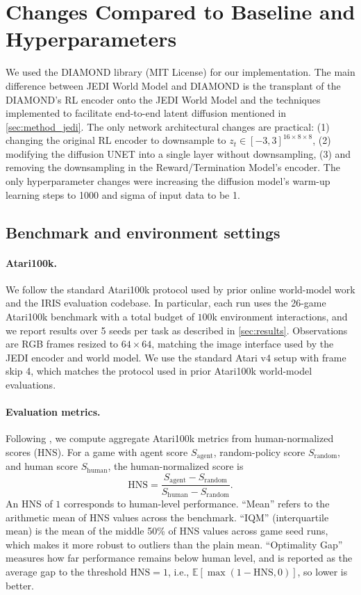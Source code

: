 \documentclass{article}
\begin{document}
\section{Changes Compared to Baseline and Hyperparameters}
\label{appendix:hyperparameters}
We used the DIAMOND library \citep{alonso2024diamond} (MIT License) for our implementation. The main difference between JEDI World Model and DIAMOND is the transplant of the DIAMOND's RL encoder onto the JEDI World Model and the techniques implemented to facilitate end-to-end latent diffusion mentioned in \cref{sec:method_jedi}. The only network architectural changes are practical: (1) changing the original RL encoder to downsample to $z_t \in [-3,3]^{16\times8\times8}$, (2) modifying the diffusion UNET \citep{ronneberger2015UNET} into a single layer without downsampling, (3) and removing the downsampling in the Reward/Termination Model's encoder. The only hyperparameter changes were increasing the diffusion model's warm-up learning steps to 1000 and sigma of input data to be 1. 

\subsection{Benchmark and environment settings}
\label{appendix:benchmark-settings}
\paragraph{Atari100k.}
We follow the standard Atari100k protocol used by prior online world-model work and the IRIS evaluation codebase. In particular, each run uses the 26-game Atari100k benchmark with a total budget of $100$k environment interactions, and we report results over 5 seeds per task as described in \cref{sec:results}. Observations are RGB frames resized to $64\times 64$, matching the image interface used by the JEDI encoder and world model. We use the standard Atari v4 setup with frame skip 4, which matches the protocol used in prior Atari100k world-model evaluations.

\paragraph{Evaluation metrics.}
Following \citet{agarwal2021precipice}, we compute aggregate Atari100k metrics from human-normalized scores (HNS). For a game with agent score $S_{\mathrm{agent}}$, random-policy score $S_{\mathrm{random}}$, and human score $S_{\mathrm{human}}$, the human-normalized score is
\[
\mathrm{HNS}
=
\frac{S_{\mathrm{agent}} - S_{\mathrm{random}}}{S_{\mathrm{human}} - S_{\mathrm{random}}}.
\]
An HNS of $1$ corresponds to human-level performance. ``Mean'' refers to the arithmetic mean of HNS values across the benchmark. ``IQM'' (interquartile mean) is the mean of the middle 50\% of HNS values across game seed runs, which makes it more robust to outliers than the plain mean. ``Optimality Gap'' measures how far performance remains below human level, and is reported as the average gap to the threshold $\mathrm{HNS}=1$, i.e., $\mathbb{E}[\max(1-\mathrm{HNS},0)]$, so lower is better.
\end{document}
